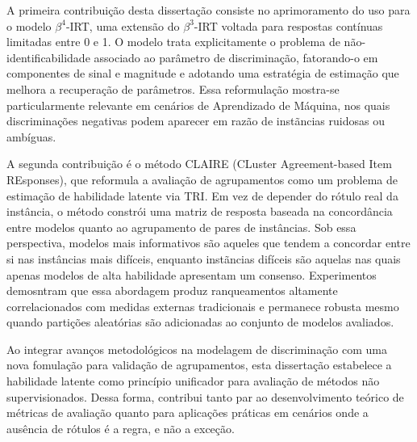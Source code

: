 A primeira contribuição desta dissertação consiste no aprimoramento do uso para o modelo $\beta^{4}$-IRT, uma extensão do $\beta^{3}$-IRT voltada para respostas contínuas limitadas entre 0 e 1. O modelo trata explicitamente o problema de não-identificabilidade associado ao parâmetro de discriminação, fatorando-o em componentes de sinal e magnitude e adotando uma estratégia de estimação que melhora a recuperação de parâmetros. Essa reformulação mostra-se particularmente relevante em cenários de Aprendizado de Máquina, nos quais discriminações negativas podem aparecer em razão de instãncias ruidosas ou ambíguas.

A segunda contribuição é o método CLAIRE (CLuster Agreement-based Item REsponses), que reformula a avaliação de agrupamentos como um problema de estimação de habilidade latente via TRI. Em vez de depender do rótulo real da instância, o método constrói uma matriz de resposta baseada na concordância entre modelos quanto ao agrupamento de pares de instâncias. Sob essa perspectiva, modelos mais informativos são aqueles que tendem a concordar entre si nas instâncias mais difíceis, enquanto instãncias difíceis são aquelas nas quais apenas modelos de alta habilidade apresentam um consenso. Experimentos demosntram que essa abordagem produz ranqueamentos altamente correlacionados com medidas externas tradicionais e permanece robusta mesmo quando partições aleatórias são adicionadas ao conjunto de modelos avaliados.

Ao integrar avanços metodológicos na modelagem de discriminação com uma nova fomulação para validação de agrupamentos, esta dissertação estabelece a habilidade latente como princípio unificador para avaliação de métodos não supervisionados. Dessa forma, contribui tanto par ao desenvolvimento teórico de métricas de avaliação quanto para aplicações práticas em cenários onde a ausência de rótulos é a regra, e não a exceção.